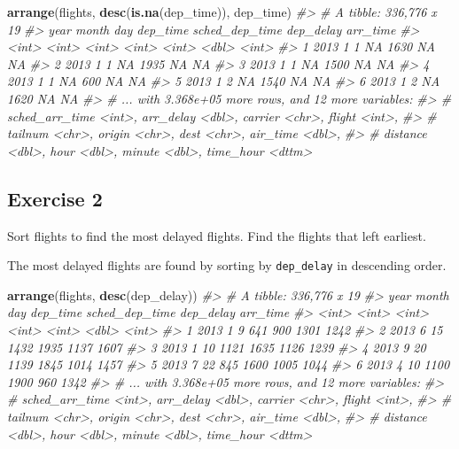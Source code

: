 \documentclass[]{book}
\newenvironment{Shaded}{\begin{snugshade}}{\end{snugshade}}
\newcommand{\CommentTok}[1]{\textcolor[rgb]{0.56,0.35,0.01}{\textit{#1}}}
\newcommand{\KeywordTok}[1]{\textcolor[rgb]{0.13,0.29,0.53}{\textbf{#1}}}
\newcommand{\NormalTok}[1]{#1}
\theoremstyle{plain}
\theoremstyle{remark}
\theoremstyle{definition}
\theoremstyle{definition}
\theoremstyle{definition}
\theoremstyle{remark}
\begin{document}
\begin{Shaded}
\begin{Highlighting}[]
\KeywordTok{arrange}\NormalTok{(flights, }\KeywordTok{desc}\NormalTok{(}\KeywordTok{is.na}\NormalTok{(dep_time)), dep_time)}
\CommentTok{#> # A tibble: 336,776 x 19}
\CommentTok{#>    year month   day dep_time sched_dep_time dep_delay arr_time}
\CommentTok{#>   <int> <int> <int>    <int>          <int>     <dbl>    <int>}
\CommentTok{#> 1  2013     1     1       NA           1630        NA       NA}
\CommentTok{#> 2  2013     1     1       NA           1935        NA       NA}
\CommentTok{#> 3  2013     1     1       NA           1500        NA       NA}
\CommentTok{#> 4  2013     1     1       NA            600        NA       NA}
\CommentTok{#> 5  2013     1     2       NA           1540        NA       NA}
\CommentTok{#> 6  2013     1     2       NA           1620        NA       NA}
\CommentTok{#> # ... with 3.368e+05 more rows, and 12 more variables:}
\CommentTok{#> #   sched_arr_time <int>, arr_delay <dbl>, carrier <chr>, flight <int>,}
\CommentTok{#> #   tailnum <chr>, origin <chr>, dest <chr>, air_time <dbl>,}
\CommentTok{#> #   distance <dbl>, hour <dbl>, minute <dbl>, time_hour <dttm>}
\end{Highlighting}
\end{Shaded}

\hypertarget{exercise-2-6}{%
\subsection{Exercise 2}\label{exercise-2-6}}

Sort flights to find the most delayed flights. Find the flights that
left earliest.

The most delayed flights are found by sorting by \texttt{dep\_delay} in
descending order.

\begin{Shaded}
\begin{Highlighting}[]
\KeywordTok{arrange}\NormalTok{(flights, }\KeywordTok{desc}\NormalTok{(dep_delay))}
\CommentTok{#> # A tibble: 336,776 x 19}
\CommentTok{#>    year month   day dep_time sched_dep_time dep_delay arr_time}
\CommentTok{#>   <int> <int> <int>    <int>          <int>     <dbl>    <int>}
\CommentTok{#> 1  2013     1     9      641            900      1301     1242}
\CommentTok{#> 2  2013     6    15     1432           1935      1137     1607}
\CommentTok{#> 3  2013     1    10     1121           1635      1126     1239}
\CommentTok{#> 4  2013     9    20     1139           1845      1014     1457}
\CommentTok{#> 5  2013     7    22      845           1600      1005     1044}
\CommentTok{#> 6  2013     4    10     1100           1900       960     1342}
\CommentTok{#> # ... with 3.368e+05 more rows, and 12 more variables:}
\CommentTok{#> #   sched_arr_time <int>, arr_delay <dbl>, carrier <chr>, flight <int>,}
\CommentTok{#> #   tailnum <chr>, origin <chr>, dest <chr>, air_time <dbl>,}
\CommentTok{#> #   distance <dbl>, hour <dbl>, minute <dbl>, time_hour <dttm>}
\end{Highlighting}
\end{Shaded}
\end{document}
